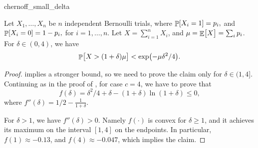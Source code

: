 \begin{fragment}{chernoff_small_delta}
    \begin{lemma}
        Let $X_1, \ldots, X_n$ be $n$ independent Bernoulli trials, where
        \begin{math}
            \Prob{  X_i = 1 } =p_i,
        \end{math}
        and
        \begin{math}
            \Prob{  X_i = 0 } =1- p_i,
        \end{math}
        for $i=1,\ldots, n$.  Let $X = \sum_{i=1}^{n} X_i$, and
        $\mu = \mathop{\mathbb{E}}\!\left[ {\bigl. X} \right] = \sum_i p_i$.  For $\delta \in (0,4)$, we have
        \begin{equation*}
            \Prob{ \bigl. X > (1+\delta)\mu } < \exp \pth{-\mu \delta^2 /
               4}.
        \end{equation*}
    \end{lemma}
\end{fragment}
\begin{proof}
     implies a stronger bound, so we
    need to prove the claim only for $\delta \in (1,4]$.
    Continuing as in the proof of ,
    for case $c=4$, we have to prove that
    \begin{equation*}
        f(\delta) = \delta^2/4 + \delta -(1+\delta) \ln(1+\delta)
        \leq 0,
    \end{equation*}
    where
    \begin{math}
        f''(\delta) = 1/2 - \frac{1}{1+\delta}.
    \end{math}

    For $\delta > 1$, we have $f''(\delta) > 0$. Namely $f(\cdot)$ is
    convex for $\delta \geq 1$, and it achieves its maximum on the
    interval $[1,4]$ on the endpoints. In particular,
    $f(1)\approx -0.13$, and $f(4) \approx -0.047$, which implies the
    claim.
\end{proof}



